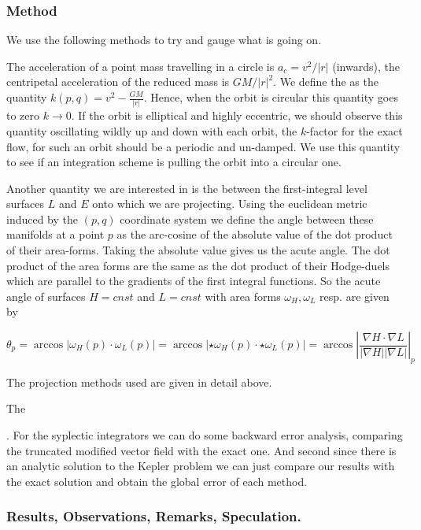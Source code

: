 \documentclass[12pt]{article}
\begin{document}
\subsubsection{Method}

We use the following methods to try and gauge what is going on.

The acceleration of a point mass travelling in a circle is $a_c = v^2/|r|$ (inwards), the centripetal acceleration of the reduced mass is $GM/{|r|^2}$. We define the  as the quantity $k(p,q) = v^2 - \frac{GM}{|r|}$. Hence, when the orbit is circular this quantity goes to zero $k\to 0$. If the orbit is elliptical and highly eccentric, we should observe this quantity oscillating wildly up and down with each orbit, the $k$-factor for the exact flow, for such an orbit should be a periodic and un-damped. We use this quantity to see if an integration scheme is pulling the orbit into a circular one. 

Another quantity we are interested in is the  between the first-integral level surfaces $L$ and $E$ onto which we are projecting. Using the euclidean metric induced by the $(p,q)$ coordinate system we define the angle between these manifolds at a point $p$ as the arc-cosine of the absolute value of the dot product of their area-forms. Taking the absolute value gives us the acute angle. The dot product of the area forms are the same as the dot product of their Hodge-duels which are parallel to the gradients of the first integral functions. So the acute angle of surfaces $H=cnst$ and $L=cnst$ with area forms $\omega_H,\omega_L$ resp. are given by 

\begin{equation}\label{eq:angle between level sets}
    \theta_p = \arccos{|\omega_H(p) \cdot \omega_L(p)|} = \arccos|\star \omega_H(p) \cdot \star\omega_L(p)| = \arccos\left| \frac{\nabla H \cdot \nabla L }{|\nabla H| |\nabla L|} \right|_p
\end{equation}

The projection methods used are given in detail above.

The 

. For the syplectic integrators we can do some backward error analysis, comparing the truncated modified vector field with the exact one. And second since there is an analytic solution to the Kepler problem we can just compare our results with the exact solution and obtain the global error of each method. 

\subsubsection{Results, Observations, Remarks, Speculation.}
\end{document}
